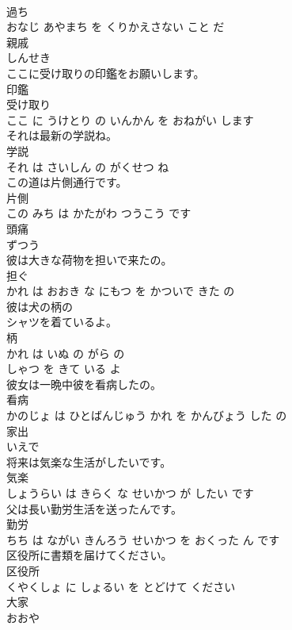 \documentclass[8pt]{extreport}
\begin{document}
\begin{CJK}{UTF8}{min}
\\	過ち 
\\	おなじ あやまち を くりかえさない こと だ			
\\	親戚	
\\	しんせき			
\\	ここに受け取りの印鑑をお願いします。	
\\	印鑑 
\\	受け取り 
\\	ここ に うけとり の いんかん を おねがい します			
\\	それは最新の学説ね。	
\\	学説 
\\	それ は さいしん の がくせつ ね			
\\	この道は片側通行です。	
\\	片側 
\\	この みち は かたがわ つうこう です			
\\	頭痛	
\\	ずつう			
\\	彼は大きな荷物を担いで来たの。	
\\	担ぐ 
\\	かれ は おおき な にもつ を かついで きた の			
\\	彼は犬の柄の
\\	シャツを着ているよ。	
\\	柄 
\\	かれ は いぬ の がら の 
\\	しゃつ を きて いる よ			
\\	彼女は一晩中彼を看病したの。	
\\	看病 
\\	かのじょ は ひとばんじゅう かれ を かんびょう した の			
\\	家出	
\\	いえで			
\\	将来は気楽な生活がしたいです。	
\\	気楽 
\\	しょうらい は きらく な せいかつ が したい です			
\\	父は長い勤労生活を送ったんです。	
\\	勤労 
\\	ちち は ながい きんろう せいかつ を おくった ん です			
\\	区役所に書類を届けてください。	
\\	区役所 
\\	くやくしょ に しょるい を とどけて ください			
\\	大家	
\\	おおや			

\end{CJK}
\end{document}
